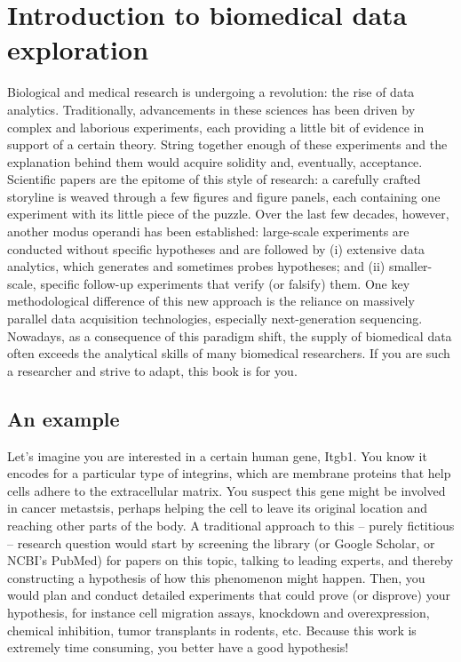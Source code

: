 \documentclass[12pt,a4paper,notitlepage,onecolumn]{article}
\title{\Title}
\author{\Author \\[2ex] \url{http://fabilab.org}}
\date{\today}
\begin{document}
\maketitle

\section{Introduction to biomedical data exploration}
Biological and medical research is undergoing a revolution: the rise of data analytics. Traditionally, advancements in these sciences has been driven by complex and laborious experiments, each providing a little bit of evidence in support of a certain theory. String together enough of these experiments and the explanation behind them would acquire solidity and, eventually, acceptance. Scientific papers are the epitome of this style of research: a carefully crafted storyline is weaved through a few figures and figure panels, each containing one experiment with its little piece of the puzzle. Over the last few decades, however, another modus operandi has been established: large-scale experiments are conducted without specific hypotheses and are followed by (i) extensive data analytics, which generates and sometimes probes hypotheses; and (ii) smaller-scale, specific follow-up experiments that verify (or falsify) them. One key methodological difference of this new approach is the reliance on massively parallel data acquisition technologies, especially next-generation sequencing. Nowadays, as a consequence of this paradigm shift, the supply of biomedical data often exceeds the analytical skills of many biomedical researchers. If you are such a researcher and strive to adapt, this book is for you.

\subsection*{An example}
Let's imagine you are interested in a certain human gene, Itgb1. You know it encodes for a particular type of integrins, which are membrane proteins that help cells adhere to the extracellular matrix. You suspect this gene might be involved in cancer metastsis, perhaps helping the cell to leave its original location and reaching other parts of the body. A traditional approach to this -- purely fictitious -- research question would start by screening the library (or Google Scholar, or NCBI's PubMed) for papers on this topic, talking to leading experts, and thereby constructing a hypothesis of how this phenomenon might happen. Then, you would plan and conduct detailed experiments that could prove (or disprove) your hypothesis, for instance cell migration assays, knockdown and overexpression, chemical inhibition, tumor transplants in rodents, etc. Because this work is extremely time consuming, you better have a good hypothesis!
\end{document}
